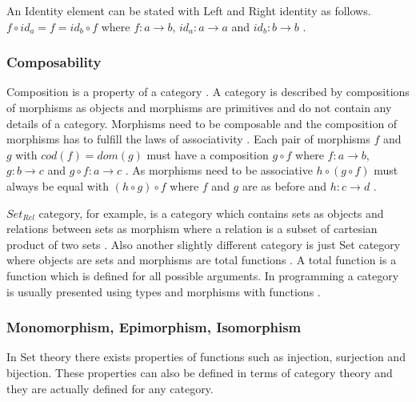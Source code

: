 \documentclass[article]{aaltoseries}
\begin{document}
    An Identity element can be stated with Left and Right identity as follows.
    $f \circ id_a = f = id_b \circ f$ where $f: a \rightarrow b$, $id_a: a
    \rightarrow a$ and $id_b: b \rightarrow b$ \cite{computational, barr1990category}.


  \subsubsection{Composability}
    Composition is a property of a category \cite{barr1990category,
      mac2013categories}. A category is described by compositions of morphisms
    as objects and morphisms are primitives and do not contain any details of a
    category. Morphisms need to be composable and the composition of morphisms
    has to fulfill the laws of associativity \cite{barr1990category,
      computational, mac2013categories}. Each pair of morphisms $f$ and $g$ with
    $cod(f) = dom(g)$ must have a composition $g \circ f$ where $f: a
    \rightarrow b$, $g: b \rightarrow c$ and $g \circ f: a \rightarrow c$
    \cite{mac2013categories}. As morphisms need to be associative $h \circ (g
    \circ f)$ must always be equal with $(h \circ g) \circ f$ where $f$ and $g$
    are as before and $h: c \rightarrow d$ \cite{eilenberg1945general,
      computational, barr1990category, awodey2006category, mac2013categories}.
 
    $Set_{Rel}$ category, for example, is a category which contains sets as objects and
    relations between sets as morphism where a relation is a subset of cartesian
    product of two sets \cite{computational}. Also another slightly different
    category is just Set category where objects are sets and morphisms are total
    functions \cite{barr1990category, computational}. A total function is a
    function which is defined for all possible arguments. In programming a category
    is usually presented using types and morphisms with functions
    \cite{computational}.


  \subsubsection{Monomorphism, Epimorphism, Isomorphism}
    In Set theory there exists properties of functions such as injection,
    surjection and bijection. These properties can also be defined in terms of
    category theory and they are actually defined for any category.
\end{document}
